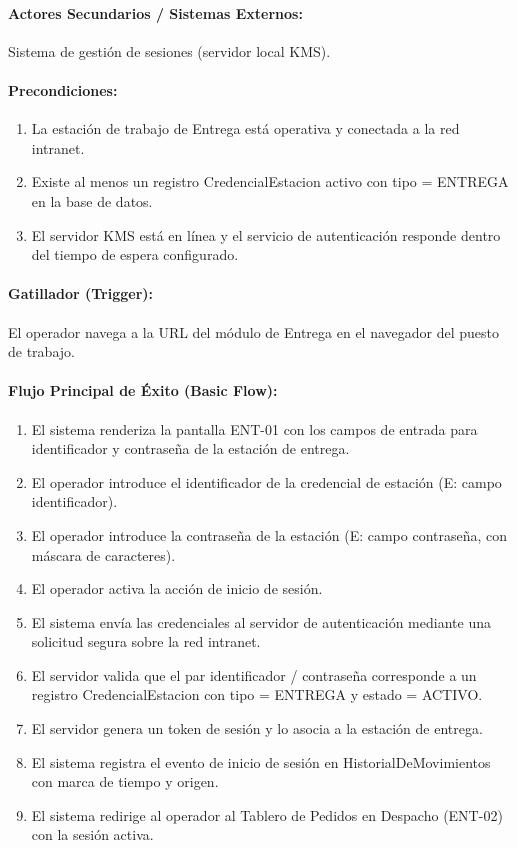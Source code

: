 \paragraph{Actores Secundarios / Sistemas Externos:} Sistema de gestión de sesiones (servidor local KMS).

\paragraph{Precondiciones:}
\begin{enumerate}
    \item[I.] La estación de trabajo de Entrega está operativa y conectada a la red intranet.
    \item[II.] Existe al menos un registro CredencialEstacion activo con tipo = ENTREGA en la base de datos.
    \item[III.] El servidor KMS está en línea y el servicio de autenticación responde dentro del tiempo de espera configurado.
\end{enumerate}

\paragraph{Gatillador (Trigger):} El operador navega a la URL del módulo de Entrega en el navegador del puesto de trabajo.

\paragraph{Flujo Principal de Éxito (Basic Flow):}
\begin{enumerate}
    \item[I.] El sistema renderiza la pantalla ENT-01 con los campos de entrada para identificador y contraseña de la estación de entrega.
    \item[II.] El operador introduce el identificador de la credencial de estación (E: campo identificador).
    \item[III.] El operador introduce la contraseña de la estación (E: campo contraseña, con máscara de caracteres).
    \item[IV.] El operador activa la acción de inicio de sesión.
    \item[V.] El sistema envía las credenciales al servidor de autenticación mediante una solicitud segura sobre la red intranet.
    \item[VI.] El servidor valida que el par identificador / contraseña corresponde a un registro CredencialEstacion con tipo = ENTREGA y estado = ACTIVO.
    \item[VII.] El servidor genera un token de sesión y lo asocia a la estación de entrega.
    \item[VIII.] El sistema registra el evento de inicio de sesión en HistorialDeMovimientos con marca de tiempo y origen.
    \item[IX.] El sistema redirige al operador al Tablero de Pedidos en Despacho (ENT-02) con la sesión activa.
\end{enumerate}

